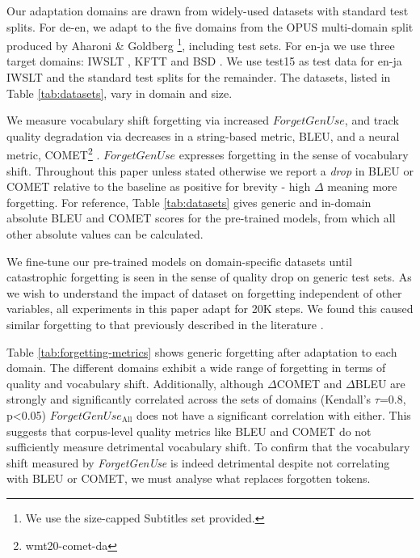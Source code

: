 \documentclass[11pt]{article}
\begin{document}
Our adaptation domains are drawn from widely-used datasets with standard test splits. For de-en, we adapt to the five domains from the OPUS multi-domain split produced by Aharoni \& Goldberg \footnote{We use the size-capped Subtitles set provided.}, including test sets. For en-ja  we use three target domains: IWSLT \cite{cettolo-etal-2012-wit3}, KFTT \cite{neubig11kftt} and BSD \cite{rikters-etal-2019-designing}. We use test15 as test data for en-ja IWSLT and the standard test splits for the remainder.
 The datasets, listed in Table \ref{tab:datasets}, vary  in domain and size.


We measure vocabulary shift forgetting via increased $ForgetGenUse$, and track quality degradation via decreases in a string-based metric, BLEU, and a neural metric, COMET\footnote{wmt20-comet-da}  \cite{rei-etal-2020-comet}. $ForgetGenUse$ expresses forgetting in the sense of vocabulary shift. Throughout this paper unless stated otherwise we report a \emph{drop} in BLEU or COMET relative to the baseline as positive for brevity - high  $\Delta$ meaning more forgetting. For reference, Table \ref{tab:datasets} gives generic and in-domain absolute BLEU and COMET scores for the pre-trained models, from which all other absolute values can be calculated.

We fine-tune our pre-trained models on domain-specific datasets until catastrophic forgetting is seen in the sense of quality drop on generic test sets. As we wish to understand the impact of dataset on forgetting independent of other variables, all experiments in this paper adapt for 20K steps. We found this caused similar forgetting to that previously described in the literature \cite{hasler-etal-2021-improving}.


Table \ref{tab:forgetting-metrics} shows generic forgetting after adaptation to each domain. The different domains exhibit a wide range of forgetting in terms of quality and vocabulary shift. Additionally, although $\Delta$COMET and $\Delta$BLEU are strongly and significantly correlated across the sets of domains (Kendall's $\tau$=0.8, p<0.05)  
$ForgetGenUse_{\text{All}}$ does not have a significant correlation with either. This suggests that corpus-level quality metrics like BLEU and COMET do not sufficiently measure detrimental vocabulary shift. To confirm that the vocabulary shift measured by \emph{ForgetGenUse} is indeed detrimental despite not correlating with BLEU or COMET, we must analyse what replaces forgotten tokens.  %
\end{document}
